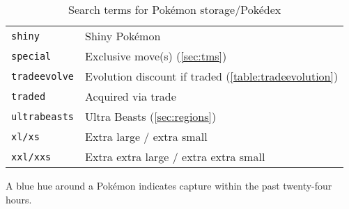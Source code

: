 \begin{table}
\begin{tabular}{ll}
\texttt{shiny} & Shiny Pokémon\\
\texttt{special} & Exclusive move(s) (\autoref{sec:tms})\\
\texttt{tradeevolve} & Evolution discount if traded (\autoref{table:tradeevolution})\\
\texttt{traded} & Acquired via trade\\
\texttt{ultrabeasts} & Ultra Beasts (\autoref{sec:regions})\\
\texttt{xl/xs} & Extra large / extra small\\
\texttt{xxl/xxs} & Extra extra large / extra extra small\\
\end{tabular}
\caption{Search terms for Pokémon storage/Pokédex\label{table:searchterms}}
\end{table}
A blue hue around a Pokémon indicates capture within the past twenty-four hours.
